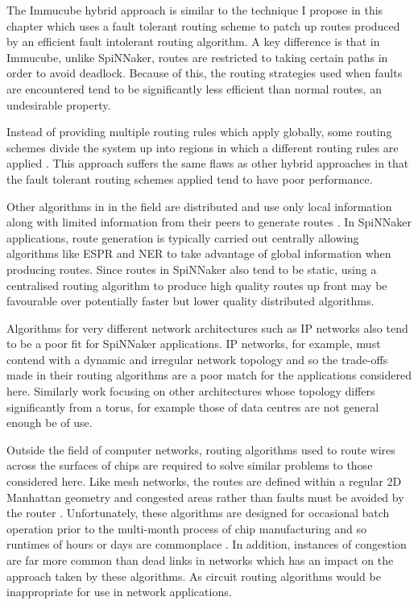 			The Immucube hybrid approach is similar to the technique I propose in
			this chapter which uses a fault tolerant routing scheme to patch up
			routes produced by an efficient fault intolerant routing algorithm. A key
			difference is that in Immucube, unlike SpiNNaker, routes are restricted
			to taking certain paths in order to avoid deadlock.  Because of this, the
			routing strategies used when faults are encountered tend to be
			significantly less efficient than normal routes, an undesirable property.
			
			Instead of providing multiple routing rules which apply globally, some
			routing schemes divide the system up into regions in which a different
			routing rules are applied \cite{mejia06,boppana95}. This approach suffers
			the same flaws as other hybrid approaches in that the fault tolerant
			routing schemes applied tend to have poor performance.
			
			Other algorithms in in the field are distributed and use only local
			information along with limited information from their peers to generate
			routes \cite{fick09b}. In SpiNNaker applications, route generation is
			typically carried out centrally allowing algorithms like ESPR and NER to
			take advantage of global information when producing routes. Since routes
			in SpiNNaker also tend to be static, using a centralised routing
			algorithm to produce high quality routes up front may be favourable over
			potentially faster but lower quality distributed algorithms.
			
			Algorithms for very different network architectures such as IP networks
			also tend to be a poor fit for SpiNNaker applications. IP networks, for
			example, must contend with a dynamic and irregular network topology and
			so the trade-offs made in their routing algorithms are a poor match for
			the applications considered here.  Similarly work focusing on other
			architectures whose topology differs significantly from a torus, for
			example those of data centres \cite{guo08,liao12} are not general enough
			be of use.
			
			Outside the field of computer networks, routing algorithms used to route
			wires across the surfaces of chips are required to solve similar problems
			to those considered here. Like mesh networks, the routes are defined
			within a regular 2D Manhattan geometry and congested areas rather than
			faults must be avoided by the router \cite{kahng11}.  Unfortunately,
			these algorithms are designed for occasional batch operation prior to the
			multi-month process of chip manufacturing and so runtimes of hours or
			days are commonplace \cite{nam08}. In addition, instances of congestion
			are far more common than dead links in networks which has an impact on
			the approach taken by these algorithms. As circuit routing algorithms
			would be inappropriate for use in network applications.
	
